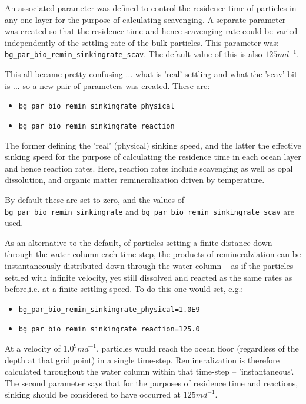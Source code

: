 \documentclass[11pt,fleqn]{book} %
\begin{document}
An associated parameter was defined to control the residence time of particles in any one layer for the purpose of calculating scavenging. A separate parameter was created so that the residence time and hence scavenging rate could be varied independently of the settling rate of the bulk particles. This parameter was: \texttt{bg\_par\_bio\_remin\_sinkingrate\_scav}. The default value of this is also \(125md^{-1}\).

This all became pretty confusing ... what is 'real' settling and what the 'scav' bit is ... so a new pair of parameters was created. These are:
\vspace{1mm}
\begin{itemize}[noitemsep]
\item \texttt{bg\_par\_bio\_remin\_sinkingrate\_physical}
\item \texttt{bg\_par\_bio\_remin\_sinkingrate\_reaction}
\end{itemize}
\vspace{1mm}
The former defining the 'real' (physical) sinking speed, and the latter the effective sinking speed for the purpose of calculating the residence time in each ocean layer and hence reaction rates. Here, reaction rates include scavenging as well as opal dissolution, and organic matter remineralization driven by temperature.

By default these are set to zero, and the values of \texttt{bg\_par\_bio\_remin\_sinkingrate} and \texttt{bg\_par\_bio\_remin\_sinkingrate\_scav} are used.

As an alternative to the default, of particles setting a finite distance down through the water column each time-step, the products of remineralziation can be instantaneously distributed down through the water column -- as if the particles settled with infinite velocity, yet still dissolved and reacted as the same rates as before,i.e. at a finite settling speed. To do this one would set, e.g.:
\vspace{1mm}
\begin{itemize}[noitemsep]
\item[] \texttt{bg\_par\_bio\_remin\_sinkingrate\_physical=1.0E9}
\item[] \texttt{bg\_par\_bio\_remin\_sinkingrate\_reaction=125.0}
\end{itemize}
\vspace{1mm}
At a velocity of \(1.0^{9}md^{-1}\), particles would reach the ocean floor (regardless of the depth at that grid point) in a single time-step. Remineralization is therefore calculated throughout the water column within that time-step -- 'instantaneous'. The second parameter says that for the purposes of residence time and reactions, sinking should be considered to have occurred at \(125md^{-1}\).
\end{document}
